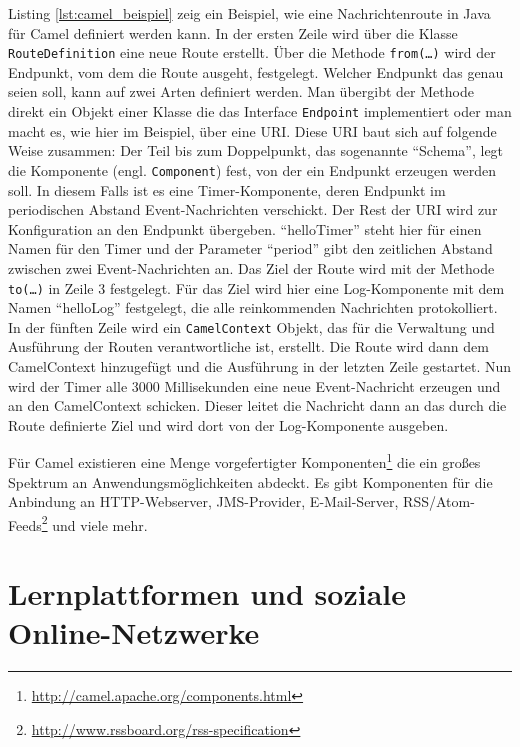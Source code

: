 Listing \ref{lst:camel_beispiel} zeig ein Beispiel, wie eine Nachrichtenroute in Java für Camel definiert werden kann. In der ersten Zeile wird über die Klasse \texttt{RouteDefinition} eine neue Route erstellt. Über die Methode \texttt{from(\dots)} wird der Endpunkt, vom dem die Route ausgeht, festgelegt. Welcher Endpunkt das genau seien soll, kann auf zwei Arten definiert werden. Man übergibt der Methode direkt ein Objekt einer Klasse die das Interface \texttt{Endpoint} implementiert oder man macht es, wie hier im Beispiel, über eine URI. Diese URI baut sich auf folgende Weise zusammen: Der Teil bis zum Doppelpunkt, das sogenannte \enquote{Schema}, legt die Komponente (engl. \texttt{Component}) fest, von der ein Endpunkt erzeugen werden soll. In diesem Falls ist es eine Timer-Komponente, deren Endpunkt im periodischen Abstand Event-Nachrichten verschickt. Der Rest der URI wird zur Konfiguration an den Endpunkt übergeben. \enquote{helloTimer} steht hier für einen Namen für den Timer und der Parameter \enquote{period} gibt den zeitlichen Abstand zwischen zwei Event-Nachrichten an. Das Ziel der Route wird mit der Methode \texttt{to(\dots)} in Zeile 3 festgelegt. Für das Ziel wird hier eine Log-Komponente mit dem Namen \enquote{helloLog} festgelegt, die alle reinkommenden Nachrichten protokolliert. In der fünften Zeile wird ein \texttt{CamelContext} Objekt, das für die Verwaltung und Ausführung der Routen verantwortliche ist, erstellt. Die Route wird dann dem CamelContext hinzugefügt und die Ausführung in der letzten Zeile gestartet. Nun wird der Timer alle 3000 Millisekunden eine neue Event-Nachricht erzeugen und an den CamelContext schicken. Dieser leitet die Nachricht dann an das durch die Route definierte Ziel und wird dort von der Log-Komponente ausgeben.

Für Camel existieren eine Menge vorgefertigter Komponenten\footnote{\url{http://camel.apache.org/components.html}} die ein großes Spektrum an Anwendungsmöglichkeiten abdeckt. Es gibt Komponenten für die Anbindung an HTTP-Webserver, JMS-Provider, E-Mail-Server, RSS/Atom-Feeds\footnote{\url{http://www.rssboard.org/rss-specification}} und viele mehr. 




\section{Lernplattformen und soziale Online-Netzwerke} %
\label{sec:lernplattformen_und_soziale_online_netzwerke}


